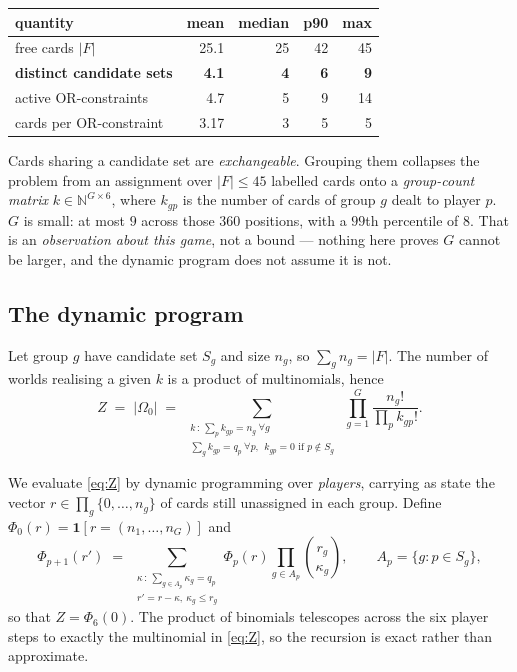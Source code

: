 \documentclass[11pt,a4paper]{article}
\newcommand{\ind}[1]{\ensuremath{\mathbf{1}\!\left[#1\right]}}
\begin{document}
\begin{center}
\begin{tabular}{lrrrr}
\toprule
quantity & mean & median & p90 & max\\
\midrule
free cards $|F|$                 & 25.1 & 25 & 42 & 45\\
\textbf{distinct candidate sets} & \textbf{4.1} & \textbf{4} & \textbf{6} & \textbf{9}\\
active OR-constraints            & 4.7 & 5 & 9 & 14\\
cards per OR-constraint          & 3.17 & 3 & 5 & 5\\
\bottomrule
\end{tabular}
\end{center}

Cards sharing a candidate set are \emph{exchangeable}. Grouping them collapses
the problem from an assignment over $|F| \le 45$ labelled cards onto a
\emph{group-count matrix} $k \in \mathbb{N}^{G\times 6}$, where $k_{gp}$ is the
number of cards of group $g$ dealt to player $p$. $G$ is small: at most $9$
across those $360$ positions, with a $99$th percentile of $8$. That is an
\emph{observation about this game}, not a bound --- nothing here proves $G$
cannot be larger, and the dynamic program does not assume it is not.

\subsection{The dynamic program}

Let group $g$ have candidate set $S_g$ and size $n_g$, so $\sum_g n_g = |F|$.
The number of worlds realising a given $k$ is a product of multinomials, hence
\begin{equation}
Z \;=\; |\Omega_0| \;=\;
\sum_{\substack{k \,:\, \sum_p k_{gp} = n_g \ \forall g \\
\sum_g k_{gp} = q_p \ \forall p, \ \ k_{gp}=0 \text{ if } p \notin S_g}}
\;\prod_{g=1}^{G} \frac{n_g!}{\prod_p k_{gp}!}.
\label{eq:Z}
\end{equation}

We evaluate \eqref{eq:Z} by dynamic programming over \emph{players}, carrying
as state the vector $r \in \prod_g \{0,\dots,n_g\}$ of cards still unassigned
in each group. Define $\Phi_0(r) = \ind{r = (n_1,\dots,n_G)}$ and
\begin{equation}
\Phi_{p+1}(r') \;=\;
\sum_{\substack{\kappa \,:\, \sum_{g \in A_p}\kappa_g = q_p\\ r' = r - \kappa,\ \kappa_g \le r_g}}
\Phi_p(r) \prod_{g \in A_p} \binom{r_g}{\kappa_g},
\qquad A_p = \{g : p \in S_g\},
\label{eq:dp}
\end{equation}
so that $Z = \Phi_6(0)$. The product of binomials telescopes across the six
player steps to exactly the multinomial in \eqref{eq:Z}, so the recursion is
exact rather than approximate.
\end{document}
